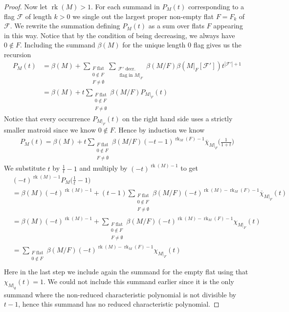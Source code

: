 \documentclass[12pt,a4paper,english]{scrartcl}
\DeclareMathOperator{\rank}{rk}
\begin{document}
\begin{proof}
Now let $\rank(M)>1$.
For each summand in $P_M(t)$ corresponding to a flag $\mathcal{F}$ of length $k>0$ we single out the largest proper non-empty flat $F=F_k$ of $\mathcal{F}$. We rewrite the summation defining $P_M(t)$ as a sum over flats $F$ appearing in this way. Notice that by the condition of being decreasing, we always have $0\notin F$. Including the summand $\beta(M)$ for the unique length 0 flag gives us the recursion 
\begin{align*}
    P_M(t)&=\beta(M)+\sum_{\substack{F \text{ flat} \\ 0\notin F\\F\neq \emptyset}}\sum_{\substack{\mathcal{F}' \text{ decr.} \\ \text{ flag in }M|_F}}\beta(M/F)\beta(M|_F[\mathcal{F}'])t^{|\mathcal{F}'|+1} \\
    &=\beta(M)+t\sum_{\substack{F \text{ flat} \\ 0\notin F\\F\neq \emptyset}}\beta(M/F)P_{M|_F}(t)
\end{align*}
Notice that every occurrence $P_{M|_F}(t)$ on the right hand side uses a strictly smaller matroid since we know $0\notin F$. Hence by induction we know \begin{align*}
        P_M(t)=\beta(M)+t\sum_{\substack{F \text{ flat} \\ 0\notin F\\F\neq \emptyset}}\beta(M/F)(-t-1)^{\rank_M(F)-1}\overline{\chi}_{M|_F}\big(\frac{1}{1+t}\big)
\end{align*}
We substitute $t$ by $\frac{1}{t}-1$ and multiply by $(-t)^{\rank(M)-1}$ to get \begin{align*}
    &(-t)^{\rank(M)-1}P_M\big(\frac{1}{t}-1\big)\\&=\beta(M)(-t)^{\rank(M)-1}+(t-1)\sum_{\substack{F \text{ flat} \\ 0\notin F\\F\neq \emptyset}}\beta(M/F)(-t)^{\rank(M)-\rank_M(F)-1}\overline{\chi}_{M|_F}(t) \\
    &=\beta(M)(-t)^{\rank(M)-1}+\sum_{\substack{F \text{ flat} \\ 0\notin F\\F\neq \emptyset}}\beta(M/F)(-t)^{\rank(M)-\rank_M(F)-1}\chi_{M|_F}(t) \\
        &=\sum_{\substack{F \text{ flat} \\ 0\notin F}}\beta(M/F)(-t)^{\rank(M)-\rank_M(F)-1}\chi_{M|_F}(t) \\
\end{align*}
Here in the last step we include again the summand for the empty flat using that $\chi_{M|_\emptyset}(t)=1$. We could not include this summand earlier since it is the only summand where the non-reduced characteristic polynomial is not divisible by $t-1$, hence this summand has no reduced characteristic polynomial. 


\end{proof}
\end{document}
